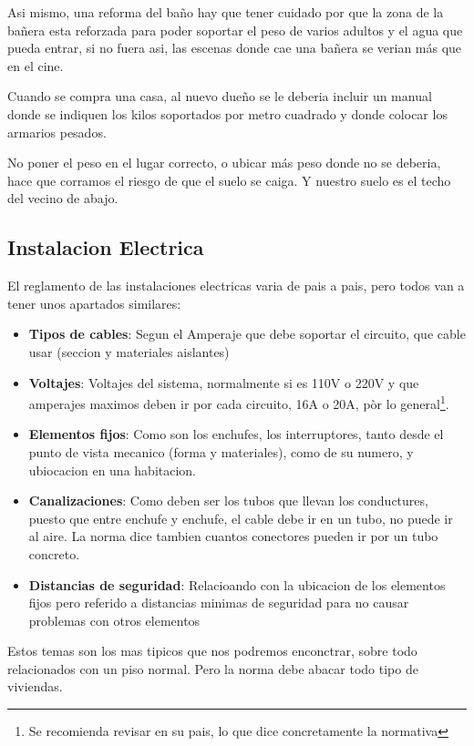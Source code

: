 Asi mismo, una reforma del baño hay que tener cuidado por que la zona de la bañera esta reforzada para poder soportar el peso de varios adultos y el agua que pueda entrar, si no fuera asi, las escenas donde cae una bañera se verian más que en el cine.

Cuando se compra una casa, al nuevo dueño se le deberia incluir un manual donde se indiquen los kilos soportados por metro cuadrado y donde colocar los armarios pesados.

No poner el peso en el lugar correcto, o ubicar más peso donde no se deberia, hace que corramos el riesgo de que el suelo se caiga. Y nuestro suelo es el techo del vecino de abajo.
\subsection{Instalacion Electrica}
El reglamento de las instalaciones electricas varia de pais a pais, pero todos van a tener unos apartados similares:
\begin{itemize}
	\item \textbf{Tipos de cables}: Segun el Amperaje que debe soportar el circuito, que cable usar (seccion y materiales aislantes)
	\item \textbf{Voltajes}: Voltajes del sistema, normalmente si es 110V o 220V y que amperajes maximos deben ir por cada circuito, 16A o 20A, pòr lo general\footnote{Se recomienda revisar en su pais, lo que dice concretamente la normativa}.
	\item \textbf{Elementos fijos}: Como son los enchufes, los interruptores, tanto desde el punto de vista mecanico (forma y materiales), como de su numero, y ubiocacion en una habitacion. 
	\item \textbf{Canalizaciones}: Como deben ser los tubos que llevan los conductures, puesto que entre enchufe y enchufe, el cable debe ir en un tubo, no puede ir al aire. La norma dice tambien cuantos conectores pueden ir por un tubo concreto.
	\item \textbf{Distancias de seguridad}: Relacioando con la ubicacion de los elementos fijos  pero referido a distancias minimas de seguridad para no causar problemas con otros elementos
\end{itemize}
Estos temas son los mas tipicos que nos podremos enconctrar, sobre todo relacionados con un piso normal. Pero la norma debe abacar todo tipo de viviendas.

